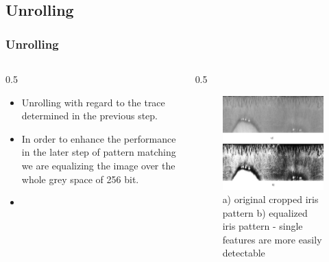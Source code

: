 \documentclass{beamer}
\begin{document}
\subsection{Unrolling}
\begin{frame}
    [fragile] \frametitle{Unrolling}
    \begin{columns}
        \begin{column}
            {0.5
            \textwidth}
            \begin{itemize}
                \item Unrolling with regard to the trace determined in the previous step.
                \item In order to enhance the performance in the later step of pattern matching we are equalizing the image over the whole grey space of 256 bit.
                \item
            \end{itemize}
        \end{column}
        \begin{column}
            {0.5
            \textwidth}
            \begin{figure}
                [ht] \centering
                \includegraphics[width=0.99
                \textwidth]{../report/iris/iris_unrolled.png} \caption{a) original cropped iris pattern b) equalized iris pattern - single features are more easily detectable} \label{fig:unrolled_iris}
            \end{figure}
        \end{column}
    \end{columns}
\end{frame}
\end{document}
